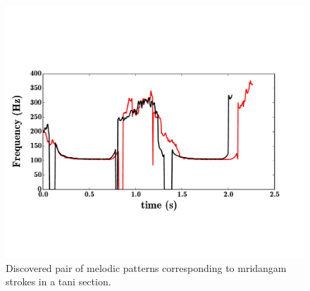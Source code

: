 {\begin{figure}
	\begin{center}
		\includegraphics[width=\figSizeNinety]{ch05_preprocessing/figures/taniPatterns.pdf}
	\end{center}
	\caption{Discovered pair of melodic patterns corresponding to \gls{mridangam} strokes in a \gls{tani} section.}
	\label{fig:pitch_pattern_tani}
\end{figure}

}
